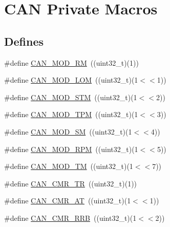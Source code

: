 \hypertarget{group___c_a_n___private___macros}{\section{\-C\-A\-N \-Private \-Macros}
\label{group___c_a_n___private___macros}
}
\subsection*{\-Defines}
\begin{DoxyCompactItemize}
\item 
\#define \hyperlink{group___c_a_n___private___macros_gafd10049f6c1d6a63bfb481578d97de16}{\-C\-A\-N\-\_\-\-M\-O\-D\-\_\-\-R\-M}~((uint32\-\_\-t)(1))
\item 
\#define \hyperlink{group___c_a_n___private___macros_ga4242a50d3797d3ea05304d81eb8fd891}{\-C\-A\-N\-\_\-\-M\-O\-D\-\_\-\-L\-O\-M}~((uint32\-\_\-t)(1$<$$<$1))
\item 
\#define \hyperlink{group___c_a_n___private___macros_ga0131118db0e68b5635a10777cbd794e7}{\-C\-A\-N\-\_\-\-M\-O\-D\-\_\-\-S\-T\-M}~((uint32\-\_\-t)(1$<$$<$2))
\item 
\#define \hyperlink{group___c_a_n___private___macros_gad8795757b9206a4daee0f5a40517385f}{\-C\-A\-N\-\_\-\-M\-O\-D\-\_\-\-T\-P\-M}~((uint32\-\_\-t)(1$<$$<$3))
\item 
\#define \hyperlink{group___c_a_n___private___macros_gab0cd0939676d3c6ce846e47cc8cc2b15}{\-C\-A\-N\-\_\-\-M\-O\-D\-\_\-\-S\-M}~((uint32\-\_\-t)(1$<$$<$4))
\item 
\#define \hyperlink{group___c_a_n___private___macros_gaec973a15597675e749f4033835dd66f9}{\-C\-A\-N\-\_\-\-M\-O\-D\-\_\-\-R\-P\-M}~((uint32\-\_\-t)(1$<$$<$5))
\item 
\#define \hyperlink{group___c_a_n___private___macros_ga0fc0c3414f4f0e4166e90e271631d89b}{\-C\-A\-N\-\_\-\-M\-O\-D\-\_\-\-T\-M}~((uint32\-\_\-t)(1$<$$<$7))
\item 
\#define \hyperlink{group___c_a_n___private___macros_ga4dc9265838852815dbea8a977cfa5331}{\-C\-A\-N\-\_\-\-C\-M\-R\-\_\-\-T\-R}~((uint32\-\_\-t)(1))
\item 
\#define \hyperlink{group___c_a_n___private___macros_ga2c62ebf606fecb5f3a891642f5bc25d6}{\-C\-A\-N\-\_\-\-C\-M\-R\-\_\-\-A\-T}~((uint32\-\_\-t)(1$<$$<$1))
\item 
\#define \hyperlink{group___c_a_n___private___macros_gaca5b99941b4a44bf4fc0233cd740db2c}{\-C\-A\-N\-\_\-\-C\-M\-R\-\_\-\-R\-R\-B}~((uint32\-\_\-t)(1$<$$<$2))

\end{DoxyCompactItemize}
